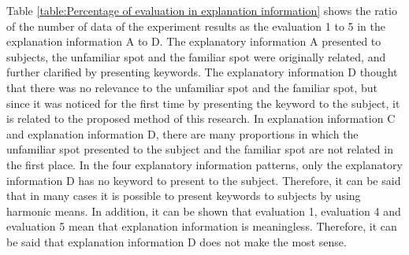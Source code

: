 \documentclass[journal]{IAENGtran}
\begin{document}
Table \ref{table:Percentage of evaluation in explanation information} shows the ratio of the number of data of the experiment results as the evaluation 1 to 5 in the explanation information A to D.
The explanatory information A presented to subjects, the unfamiliar spot and the familiar spot were originally related, and further clarified by presenting keywords.
The explanatory information D thought that there was no relevance to the unfamiliar spot and the familiar spot, but since it was noticed for the first time by presenting the keyword to the subject, it is related to the proposed method of this research.
In explanation information C and explanation information D, there are many proportions in which the unfamiliar spot presented to the subject and the familiar spot are not related in the first place.
In the four explanatory information patterns, only the explanatory information D has no keyword to present to the subject.
Therefore, it can be said that in many cases it is possible to present keywords to subjects by using harmonic means.
In addition, it can be shown that evaluation 1, evaluation 4 and evaluation 5 mean that explanation information is meaningless.
Therefore, it can be said that explanation information D does not make the most sense.
\end{document}
